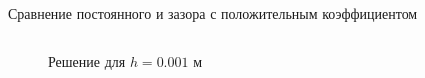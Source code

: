 \documentclass[ignoreonframetext,unicode]{beamer}
\begin{document}
\begin{frame}{Сравнение постоянного и зазора с положительным коэффициентом}
\begin{columns}
	\begin{figure}[!htbp]
		\caption{Решение для $h = 0.001$ м}
		\label{res_static}
	\end{figure}
		
	\end{columns}

	
\end{frame}
\end{document}
